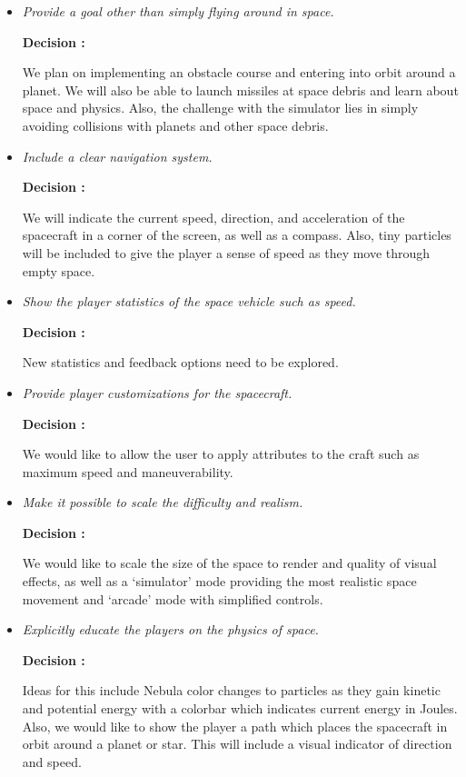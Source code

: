 \begin{itemize}
  \item \emph{Provide a goal other than simply flying around in space.}
        
        \textbf{Decision : } \parbox[t]{5in}{We plan on implementing an obstacle course and entering into orbit around a planet.  We will also be able to launch missiles at space debris and learn about space and physics.  Also, the challenge with the simulator lies in simply avoiding collisions with planets and other space debris.}

  \item \emph{Include a clear navigation system.}
        
        \textbf{Decision : } \parbox[t]{5in}{We will indicate the current speed, direction, and acceleration of the spacecraft in a corner of the screen, as well as a compass.  Also, tiny particles will be included to give the player a sense of speed as they move through empty space.}

  \item \emph{Show the player statistics of the space vehicle such as speed.}
        
        \textbf{Decision : } \parbox[t]{5in}{New statistics and feedback options need to be explored.}

  \item \emph{Provide player customizations for the spacecraft.}
        
        \textbf{Decision : } \parbox[t]{5in}{We would like to allow the user to apply attributes to the craft such as maximum speed and maneuverability.}

  \item \emph{Make it possible to scale the difficulty and realism.}
        
        \textbf{Decision : } \parbox[t]{5in}{We would like to scale the size of the space to render and quality of visual effects, as well as a `simulator' mode providing the most realistic space movement and `arcade' mode with simplified controls.}

  \item \emph{Explicitly educate the players on the physics of space.}
        
        \textbf{Decision : } \parbox[t]{5in}{Ideas for this include Nebula color changes to particles as they gain kinetic and potential energy with a colorbar which indicates current energy in Joules.  Also, we would like to show the player a path which places the spacecraft in orbit around a planet or star.  This will include a visual indicator of direction and speed.}


\end{itemize}
